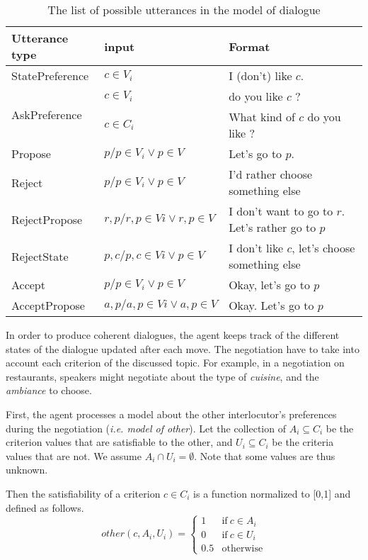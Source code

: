 \documentclass{llncs}
\begin{document}
		\begin{table}[h]
			\begin{tabular} {|p{2.5cm}|p{3.5cm}|p{6cm}|}
				\hline
				Utterance type & input & Format \\
				\hline
				StatePreference & $c \in V_i$ & I (don't) like $c$.\\
				\hline
				 \multirow{2}{*}{AskPreference} &$c \in V_i$ & do you like $c$ ?\\
				 \cline{2-3}
				 & $c \in C_i$ & What kind of $c$ do you like ? \\
				 \hline
				 Propose & $p / p\in V_i \vee p \in V$ & Let's go to $p$. \\
				 \hline
				 Reject & $p / p\in V_i \vee p \in V$ & I'd rather choose  something else \\
				 \hline
				 RejectPropose & $r, p / r,p\in Vi \vee r,p \in V $ & I don't want to go to $r$. Let's rather go to $p$ \\
				 \hline 
				 RejectState & $ p,c / p,c\in Vi \vee p \in V$ &  I don't like $c$, let's choose something else \\
				 \hline
				 Accept& $p / p\in V_i \vee p \in V$& Okay, let's go to $p$	 \\
				 \hline
				 AcceptPropose & $a,p / a,p\in Vi \vee a,p \in V $ & Okay. Let's go to $p$\\
				 \hline
			\end{tabular}
			\caption{The list of possible utterances in the model of dialogue}
		\end{table}
	
	In order to produce coherent dialogues, the agent keeps track of the different states of the dialogue updated after each move. 
	The negotiation have to take into account each criterion of the discussed topic. For example, in a negotiation on restaurants, speakers might negotiate about the type of \textit{cuisine}, and the \textit{ambiance} to choose.  
	
	First, the agent processes a model about the other interlocutor's preferences during the negotiation (\textit{i.e. model of other}). Let the collection of $A_i \subseteq C_i$ be the criterion values that are satisfiable to the other, and $U_i \subseteq C_i$ be the criteria values that are not.  We assume $A_i \cap U_i = \emptyset$.  Note that some values are thus unknown.
	
	Then the satisfiability of a criterion $c \in C_i$ is a function normalized to [0,1] and defined as follows.
	\begin{equation}
	other(c, A_i, U_i)= \left\{\begin{array}{ll}
	1	 & \mathrm{if\ }  c \in A_i\\
	0    & \mathrm{if\ }c \in U_i\\
	0.5	 & \mathrm{otherwise}
	\end{array}\right.
	\end{equation}
	
\end{document}
